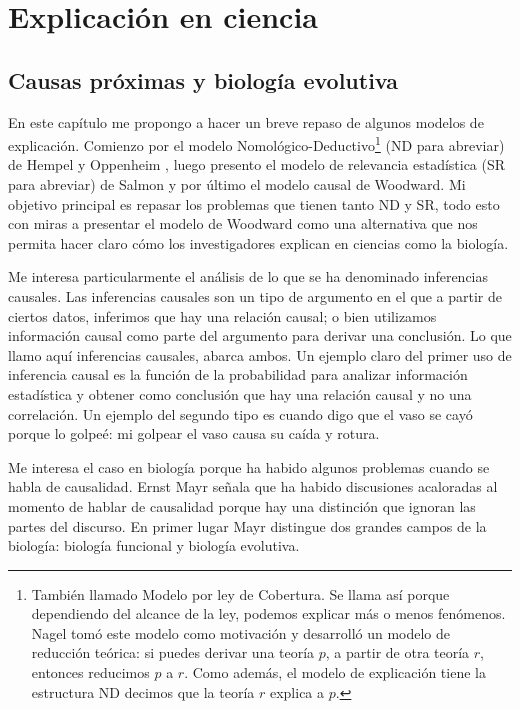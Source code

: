 \chapter{Explicación en ciencia}

\section{Causas próximas y biología evolutiva}

\noindent En este capítulo me propongo a hacer un breve repaso de algunos modelos de explicación. Comienzo por el modelo Nomológico-Deductivo\footnote{También llamado Modelo por ley de Cobertura. Se llama así porque dependiendo del alcance de la ley, podemos explicar más o menos fenómenos. Nagel tomó este modelo como motivación y desarrolló un modelo de reducción teórica: si puedes derivar una teoría $p$, a partir de otra teoría $r$, entonces reducimos $p$ a $r$. Como además, el modelo de explicación tiene la estructura ND decimos que la teoría $r$ explica a $p$.} (ND para abreviar) de Hempel y Oppenheim \citeyear{Hempel1948}, luego presento el modelo de relevancia estadística (SR para abreviar) de Salmon y por último el modelo causal de Woodward. Mi objetivo principal es repasar los problemas que tienen tanto ND y SR, todo esto con miras a presentar el modelo de Woodward como una alternativa que nos permita hacer claro cómo los investigadores explican en ciencias como la biología.

Me interesa particularmente el análisis de lo que se ha denominado inferencias causales. Las inferencias causales son un tipo de argumento en el que a partir de ciertos datos, inferimos que hay una relación causal; o bien utilizamos información causal como parte del argumento para derivar una conclusión. Lo que llamo aquí inferencias causales, abarca ambos. Un ejemplo claro del primer uso de inferencia causal es la función de la probabilidad para analizar información estadística y obtener como conclusión que hay una relación causal y no una correlación. Un ejemplo del segundo tipo es cuando digo que el vaso se cayó porque lo golpeé: mi golpear el vaso causa su caída y rotura.

Me interesa el caso en biología porque ha habido algunos problemas cuando se habla de causalidad. Ernst Mayr \citeyear{Mayr1998} señala que ha habido discusiones acaloradas al momento de hablar de causalidad porque hay una distinción que ignoran las partes del discurso. En primer lugar Mayr distingue dos grandes campos de la biología: biología funcional y biología evolutiva.

